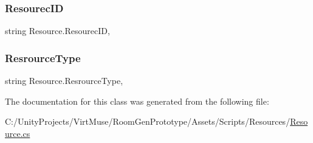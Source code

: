 \mbox{\label{class_resource_a7d8b0fc1f53ddeb34007b3ca3a8cda21}} 
\subsubsection{\texorpdfstring{Resourec\+ID}{ResourecID}}
{\footnotesize\ttfamily string Resource.\+Resourec\+ID\hspace{0.3cm}{\ttfamily [get]}, {}}

\mbox{\label{class_resource_adaaa8f2b95e5b1dd4268d4bbdc05124d}} 
\subsubsection{\texorpdfstring{Resrource\+Type}{ResrourceType}}
{\footnotesize\ttfamily string Resource.\+Resrource\+Type\hspace{0.3cm}{\ttfamily [get]}, {}}



The documentation for this class was generated from the following file\+:\begin{DoxyCompactItemize}
\item 
C\+:/\+Unity\+Projects/\+Virt\+Muse/\+Room\+Gen\+Prototype/\+Assets/\+Scripts/\+Resources/\mbox{\hyperlink{_resource_8cs}{Resource.\+cs}}\end{DoxyCompactItemize}
